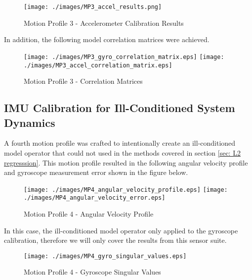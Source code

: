 \begin{figure}[h] 
	\centering
	\texttt{[image: ./images/MP3\_accel\_results.png]}
	\caption{Motion Profile 3 - Accelerometer Calibration Results}
	\label{fig: MP3 accel results}
\end{figure}
\FloatBarrier

In addition, the following model correlation matrices were achieved.

\begin{figure}[!h] 
	\centering
	\texttt{[image: ./images/MP3\_gyro\_correlation\_matrix.eps]} \hfill
	\texttt{[image: ./images/MP3\_accel\_correlation\_matrix.eps]}
	\caption{Motion Profile 3 - Correlation Matrices}
	\label{fig: MP3 correlation matrix}
\end{figure}
\FloatBarrier


\subsection{IMU Calibration for Ill-Conditioned System Dynamics}

A fourth motion profile was crafted to intentionally create an ill-conditioned model operator that could not used in the methods covered in section \ref{sec: L2 regresssion}. This motion profile resulted in the following angular velocity profile and gyroscope measurement error shown in the figure below. 

\begin{figure}[!h] 
	\centering
	\texttt{[image: ./images/MP4\_angular\_velocity\_profile.eps]} \hfill
	\texttt{[image: ./images/MP4\_angular\_velocity\_error.eps]}
	\caption{Motion Profile 4 - Angular Velocity Profile}
	\label{fig: MP4 angular velocity profile}
\end{figure}
\FloatBarrier

In this case, the ill-conditioned model operator only applied to the gyroscope calibration, therefore we will only cover the results from this sensor suite. 

\begin{figure}[h] 
	\centering
	\texttt{[image: ./images/MP4\_gyro\_singular\_values.eps]}
	\caption{Motion Profile 4 - Gyroscope Singular Values}
	\label{fig: MP4 gyro singular values}
\end{figure}
\FloatBarrier


